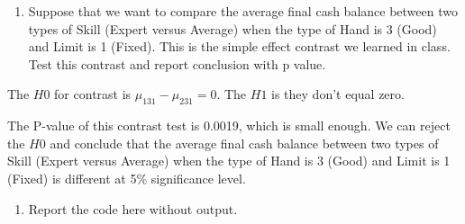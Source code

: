 \documentclass[]{article}
\providecommand{\tightlist}{%
  \setlength{\itemsep}{0pt}\setlength{\parskip}{0pt}}
\begin{document}
\begin{enumerate}
\def\labelenumi{(\alph{enumi})}
\setcounter{enumi}{4}
\tightlist
\item
  \textcolor[rgb]{0.5,0.5,0.5}{Suppose that we want to compare the average final cash balance between two types of Skill (Expert versus Average) when the type of Hand is 3 (Good) and Limit is 1 (Fixed). This is the simple effect contrast we learned in class. Test this contrast and report conclusion with p value.}
\end{enumerate}

The \(H0\) for contrast is \(\mu_{131}-\mu_{231}=0\). The \(H1\) is they
don't equal zero.

The P-value of this contrast test is 0.0019, which is small enough. We
can reject the \(H0\) and conclude that the average final cash balance
between two types of Skill (Expert versus Average) when the type of Hand
is 3 (Good) and Limit is 1 (Fixed) is different at 5\% significance
level.

\begin{enumerate}
\def\labelenumi{(\alph{enumi})}
\setcounter{enumi}{5}
\tightlist
\item
  \textcolor[rgb]{0.5,0.5,0.5}{Report the code here without output.}
\end{enumerate}
\end{document}
